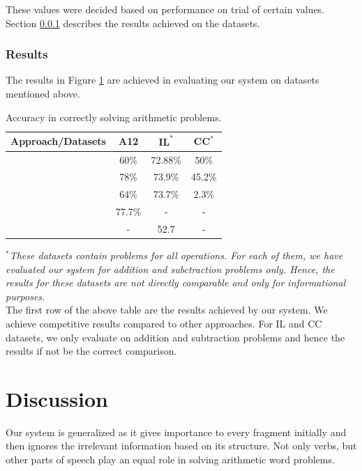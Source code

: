\documentclass[11pt]{article}
\begin{document}
These values were decided based on performance on trial of certain values. Section \ref{sec:results} describes the results achieved on the datasets.

\subsubsection{Results}\label{sec:results}

The results in Figure \ref{figure:24} are achieved in evaluating our system on datasets mentioned above. 

\begin{table}[h!]
\begin{center}
\begin{tabular}{|c|c|c|c|}
\hline
\textbf{Approach/Datasets} & \textbf{A12} & $\textbf{IL}^{*}$ & $\textbf{CC}^{*}$ \\
\hline
 & 60\% & 72.88\% & 50\% \\
\hline
~\citep{RoyR15} & 78\% & 73.9\% & 45.2\% \\
\hline
~\citep{Kushman} & 64\% & 73.7\% & 2.3\% \\
\hline
~\citep{ARIS} & 77.7\% & - & - \\
\hline
~\citep{RoyTACL15} & - & 52.7 & - \\
\hline
\end{tabular}
\end{center}
\caption{Accuracy in correctly solving arithmetic problems.}
\label{figure:24}
\end{table}

\textit{$^{*}$These datasets contain problems for all operations. For each of them, we have evaluated our system for addition and subctraction problems only. Hence, the results for these datasets are not directly comparable and only for informational purposes.}\\

The first row of the above table are the results achieved by our system. We achieve competitive results compared to other approaches. For IL and CC datasets, we only evaluate on addition and subtraction problems and hence the results if not be the correct comparison.

\section{Discussion}\label{sec:discussion}

Our system is generalized as it gives importance to every fragment initially and then ignores the irrelevant information based on its structure. Not only verbs\citep{ARIS}, but other parts of speech play an equal role in solving arithmetic word problems. 
\end{document}
